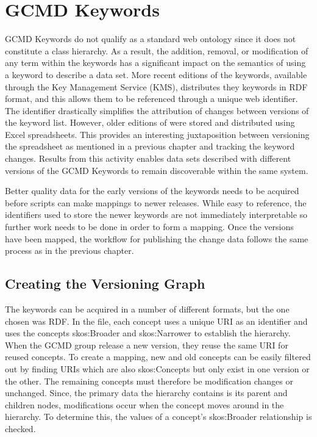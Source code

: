 \section{GCMD Keywords}
GCMD Keywords do not qualify as a standard web ontology since it does not constitute a class hierarchy.
As a result, the addition, removal, or modification of any term within the keywords has a significant impact on the semantics of using a keyword to describe a data set.
More recent editions of the keywords, available through the Key Management Service (KMS), distributes they keywords in RDF format, and this allows them to be referenced through a unique web identifier.
The identifier drastically simplifies the attribution of changes between versions of the keyword list.
However, older editions of were stored and distributed using Excel spreadsheets.
This provides an interesting juxtaposition between versioning the spreadsheet as mentioned in a previous chapter and tracking the keyword changes.
Results from this activity enables data sets described with different versions of the GCMD Keywords to remain discoverable within the same system.

Better quality data for the early versions of the keywords needs to be acquired before scripts can make mappings to newer releases.
While easy to reference, the identifiers used to store the newer keywords are not immediately interpretable so further work needs to be done in order to form a mapping.
Once the versions have been mapped, the workflow for publishing the change data follows the same process as in the previous chapter.

\subsection{Creating the Versioning Graph}

The keywords can be acquired in a number of different formats, but the one chosen was RDF.  In the file, each concept uses a unique URI as an identifier and uses the concepts skos:Broader and skos:Narrower to establish the hierarchy.  When the GCMD group release a new version, they reuse the same URI for reused concepts.  To create a mapping, new and old concepts can be easily filtered out by finding URIs which are also skos:Concepts but only exist in one version or the other.  The remaining concepts must therefore be modification changes or unchanged.  Since, the primary data the hierarchy contains is its parent and children nodes, modifications occur when the concept moves around in the hierarchy.  To determine this, the values of a concept's skos:Broader relationship is checked.


